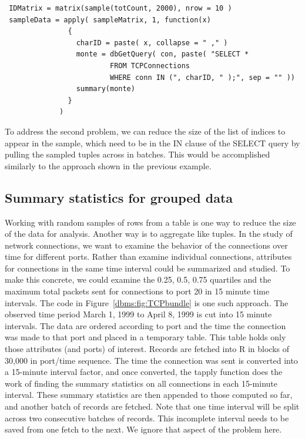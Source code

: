 \begin{verbatim}
 IDMatrix = matrix(sample(totCount, 2000), nrow = 10 )
 sampleData = apply( sampleMatrix, 1, function(x) 
               { 
                 charID = paste( x, collapse = " ," )
                 monte = dbGetQuery( con, paste( "SELECT * 
                         FROM TCPConnections 
                         WHERE conn IN (", charID, " );", sep = "" ))
                 summary(monte) 
               }
             )
\end{verbatim}

To address the second problem, we can reduce the size of the list of
indices to appear in the sample, which need to be in the IN clause 
of the SELECT query by pulling the sampled tuples across in batches.
This would be accomplished similarly to the approach shown in
the previous example.


\subsection{Summary statistics for grouped data}
Working with random samples of rows from a table is one
way to reduce the size of the data for analysis.
Another way is to aggregate like tuples.
In the study of network connections, we want to examine
the behavior of the connections over time for different ports. 
Rather than examine individual connections, attributes for
connections in the same time interval could be summarized 
and studied.  To make this concrete, we could examine 
the 0.25, 0.5, 0.75 quartiles and the maximum total packets
sent for connections to port 20 in 15 minute time intervals.
The code in Figure~\ref{dbms:fig:TCPbundle}
is one such approach.
The observed time period March 1, 1999 to April 8, 1999 is
cut into 15 minute intervals.
The data are ordered according to port and the time the 
connection was made to that port and placed in a temporary table.
This table holds only those attributes (and ports) of interest.
Records are fetched into R in blocks of 30,000 in port/time sequence.
The time the connection was sent is converted into a 15-minute
interval factor, and once converted, the tapply function does 
the work of finding the summary statistics on all connections in 
each 15-minute interval. 
These summary statistics are then appended to those computed 
so far, and another batch of records are fetched.
Note that one time interval will be split across two consecutive
batches of records. This incomplete interval needs to be saved
from one fetch to the next. We ignore that aspect of the
problem here.

